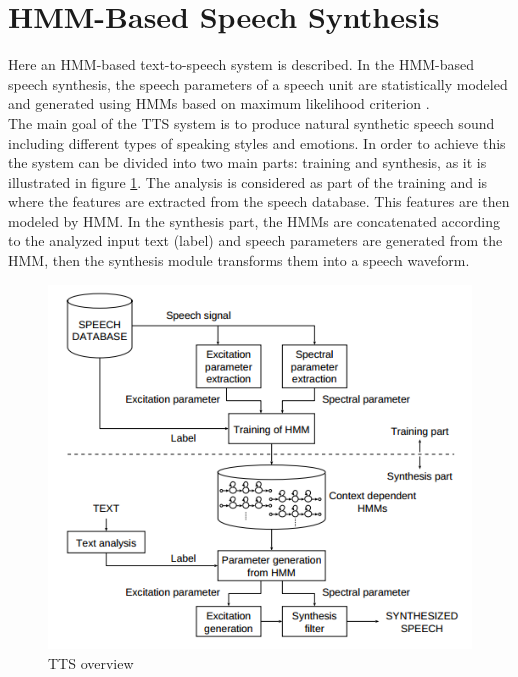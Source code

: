 \section{HMM-Based Speech Synthesis}\label{hmmbased}
Here an HMM-based text-to-speech system is described. In the HMM-based speech synthesis, the speech parameters of a speech unit are statistically modeled and generated using HMMs based on maximum likelihood criterion \cite{introhmmbased}.\\
The main goal of the TTS system is to produce natural synthetic speech sound including different types of speaking styles and emotions. In order to achieve this the system can be divided into two main parts: training and synthesis, as it is illustrated in figure \ref{ttsstruct}. The analysis is considered as part of the training and is where the features are extracted from the speech database. This features are then modeled by HMM. In the synthesis part, the HMMs are concatenated according to the analyzed input text (label) and speech parameters are generated from the HMM, then the synthesis module transforms them into a speech waveform.\\
\begin{figure}[htb]
	\begin{center}
	\includegraphics[width=1\textwidth]{img/ttsstruct.png}
	\end{center}
	\caption{\label{ttsstruct}TTS overview \cite{Tokuda02anhmm-based}}
\end{figure}
